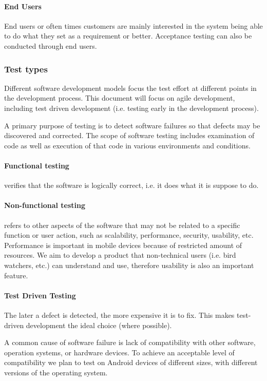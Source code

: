 \paragraph{End Users}
End users or often times customers are mainly interested in the system being able to do what they set as a requirement or better. Acceptance testing can also be conducted through end users.
\subsubsection{Test types}
Different software development models focus the test effort at different
points in the development process. This document will focus on agile
development, including test driven development (i.e. testing early in
the development process).

A primary purpose of testing is to detect software failures so that
defects may be discovered and corrected. The scope of software testing
includes examination of code as well as execution of that code in
various environments and conditions.

\paragraph{Functional testing} verifies that the software is logically correct,
i.e. it does what it is suppose to do.

\paragraph{Non-functional testing} refers to other aspects of the software that
may not be related to a specific function or user action, such as
scalability, performance, security, usability, etc. Performance is important in mobile devices because of restricted amount of
resources. We aim to develop a product that non-technical users (i.e.  bird
watchers, etc.) can understand and use, therefore usability is also an
important feature.

\paragraph{Test Driven Testing}The later a defect is detected, the more expensive it is to fix.
This makes test-driven development the ideal choice (where possible).

A common cause of software failure is lack of compatibility with other software,
operation systems, or hardware devices. To achieve an acceptable level of
compatibility we plan to test on Android devices of different sizes, with
different versions of the operating system.

